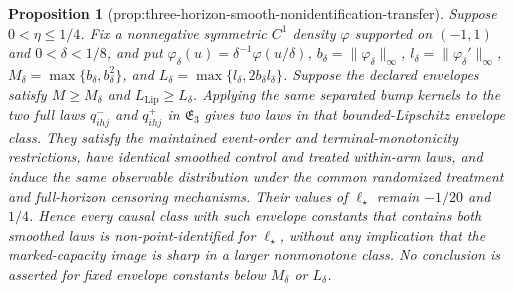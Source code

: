 \documentclass{article}
\newtheorem{proposition}{Proposition}
\begin{document}
\begin{proposition}[prop:three-horizon-smooth-nonidentification-transfer]\label{prop:three-horizon-smooth-nonidentification-transfer}
Suppose \(0<\eta\leq1/4\).  Fix a nonnegative symmetric \(C^1\) density \(\varphi\) supported on \((-1,1)\) and \(0<\delta<1/8\), and put \(\varphi_\delta(u)=\delta^{-1}\varphi(u/\delta)\), \(b_\delta=\|\varphi_\delta\|_\infty\), \(l_\delta=\|\varphi_\delta'\|_\infty\), \(M_\delta=\max\{b_\delta,b_\delta^2\}\), and \(L_\delta=\max\{l_\delta,2b_\delta l_\delta\}\).  Suppose the declared envelopes satisfy \(M\geq M_\delta\) and \(L_{\mathrm{Lip}}\geq L_\delta\).  Applying the same separated bump kernels to the two full laws \(q^-_{ihj}\) and \(q^+_{ihj}\) in \(\mathfrak E_3\) gives two laws in that bounded-Lipschitz envelope class.  They satisfy the maintained event-order and terminal-monotonicity restrictions, have identical smoothed control and treated within-arm laws, and induce the same observable distribution under the common randomized treatment and full-horizon censoring mechanisms.  Their values of \(\ell_\star\) remain \(-1/20\) and \(1/4\).  Hence every causal class with such envelope constants that contains both smoothed laws is non-point-identified for \(\ell_\star\), without any implication that the marked-capacity image is sharp in a larger nonmonotone class.  No conclusion is asserted for fixed envelope constants below \(M_\delta\) or \(L_\delta\).
\end{proposition}
\end{document}
